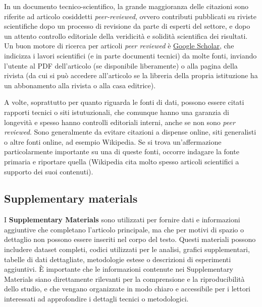\documentclass[9pt,a4paper,twoside]{rho-class/rho}
\begin{document}
In un documento tecnico-scientifico, la grande maggioranza delle citazioni sono riferite ad articolo cosiddetti \textit{peer-reviewed}, ovvero contributi pubblicati su riviste scientifiche dopo un processo di revisione da parte di esperti del settore, e dopo un attento controllo editoriale della veridicità e solidità scientifica dei risultati. Un buon motore di ricerca per articoli \textit{peer reviewed} è \href{https://scholar.google.com}{Google Scholar}, che indicizza i lavori scientifici (e in parte documenti tecnici) da molte fonti, inviando l'utente al PDF dell'articolo (se disponibile liberamente) o alla pagina della rivista (da cui si può accedere all'articolo se la libreria della propria istituzione ha un abbonamento alla rivista o alla casa editrice).

A volte, soprattutto per quanto riguarda le fonti di dati, possono essere citati rapporti tecnici o siti istutuzionali, che comunque hanno una garanzia di longevità e spesso hanno controlli editoriali interni, anche se non sono \textit{peer reviewed}. Sono generalmente da evitare citazioni a dispense online, siti generalisti o altre fonti online, ad esempio Wikipedia. Se si trova un'affermazione particolarmente importante su una di queste fonti, occorre indagare la fonte primaria e riportare quella (Wikipedia cita molto spesso articoli scientifici a supporto dei suoi contenuti). 

\subsection{Supplementary materials}
I \textbf{Supplementary Materials} sono utilizzati per fornire dati e informazioni aggiuntive che completano l’articolo principale, ma che per motivi di spazio o dettaglio non possono essere inseriti nel corpo del testo. Questi materiali possono includere dataset completi, codici utilizzati per le analisi, grafici supplementari, tabelle di dati dettagliate, metodologie estese o descrizioni di esperimenti aggiuntivi. È importante che le informazioni contenute nei Supplementary Materials siano direttamente rilevanti per la comprensione e la riproducibilità dello studio, e che vengano organizzate in modo chiaro e accessibile per i lettori interessati ad approfondire i dettagli tecnici o metodologici.
\end{document}

